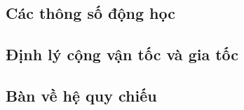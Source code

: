 \subsection{Các thông số động học}
\subsection{Định lý cộng vận tốc và gia tốc }
\subsection{Bàn về hệ quy chiếu}